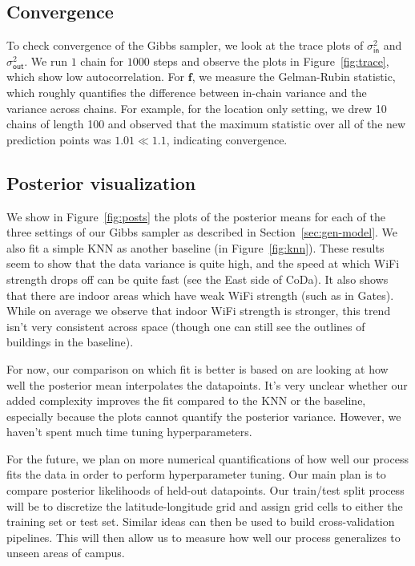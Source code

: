 \documentclass{article}
\newcommand{\bl}{\mathbf}
\newcommand{\sfout}{\mathsf{out}}
\newcommand{\sfin}{\mathsf{in}}
\begin{document}
\subsection{Convergence}
To check convergence of the Gibbs sampler, we look at the trace plots of $\sigma^2_\sfin$ and $\sigma^2_\sfout$. We run $1$ chain for $1000$ steps and observe the plots in Figure~\ref{fig:trace}, which show low autocorrelation. For $\bl{f}$, we measure the Gelman-Rubin statistic, which roughly quantifies the difference between in-chain variance and the variance across chains. For example, for the location only setting, we drew 10 chains of length 100 and observed that the maximum statistic over all of the new prediction points was $1.01 \ll 1.1$, indicating convergence.

\subsection{Posterior visualization}

We show in Figure~\ref{fig:posts} the plots of the posterior means for each of the three settings of our Gibbs sampler as described in Section~\ref{sec:gen-model}. We also fit a simple KNN as another baseline (in Figure~\ref{fig:knn}). These results seem to show that the data variance is quite high, and the speed at which WiFi strength drops off can be quite fast (see the East side of CoDa). It also shows that there are indoor areas which have weak WiFi strength (such as in Gates). While on average we observe that indoor WiFi strength is stronger, this trend isn't very consistent across space (though one can still see the outlines of buildings in the baseline). 

For now, our comparison on which fit is better is based on are looking at how well the posterior mean interpolates the datapoints. It's very unclear whether our added complexity improves the fit compared to the KNN or the baseline, especially because the plots cannot quantify the posterior variance. However, we haven't spent much time tuning hyperparameters.

For the future, we plan on more numerical quantifications of how well our process fits the data in order to perform hyperparameter tuning. Our main plan is to compare posterior likelihoods of held-out datapoints. Our train/test split process will be to discretize the latitude-longitude grid and assign grid cells to either the training set or test set. Similar ideas can then be used to build cross-validation pipelines. This will then allow us to measure how well our process generalizes to unseen areas of campus. 
\newpage
\appendix
\end{document}
